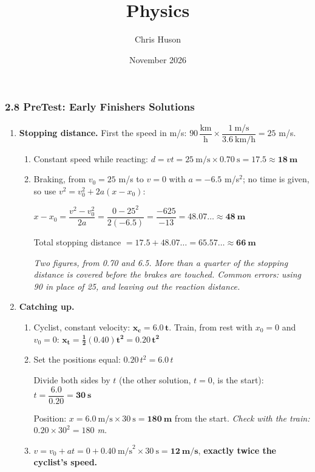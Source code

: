 \documentclass[12pt, twoside]{article}
\title{Physics}
\author{Chris Huson}
\date{November 2026}
\begin{document}
\subsubsection*{2.8 PreTest: Early Finishers Solutions}

\begin{enumerate}[itemsep=0.5cm, start=9]

\item \textbf{Stopping distance.} First the speed in m/s:
  $90\,\dfrac{\text{km}}{\text{h}} \times \dfrac{1~\text{m/s}}{3.6~\text{km/h}}
  = 25$ m/s.
  \begin{enumerate}[itemsep=0.3cm]
    \item Constant speed while reacting: \quad $d = vt = 25~\text{m/s} \times
      0.70~\text{s} = 17.5 \approx \mathbf{18~\textbf{m}}$
    \item Braking, from $v_0 = 25$ m/s to $v = 0$ with $a = -6.5$ m/s$^2$; no time
      is given, so use $v^2 = v_0^2 + 2a(x - x_0)$:

      $x - x_0 = \dfrac{v^2 - v_0^2}{2a} = \dfrac{0 - 25^2}{2(-6.5)} =
      \dfrac{-625}{-13} = 48.07\ldots \approx \mathbf{48~\textbf{m}}$

      Total stopping distance $= 17.5 + 48.07\ldots = 65.57\ldots \approx
      \mathbf{66~\textbf{m}}$

      \emph{Two figures, from 0.70 and 6.5. More than a quarter of the stopping
      distance is covered before the brakes are touched. Common errors: using
      90 in place of 25, and leaving out the reaction distance.}
  \end{enumerate}

\item \textbf{Catching up.}
  \begin{enumerate}[itemsep=0.3cm]
    \item Cyclist, constant velocity: $\mathbf{x_c = 6.0\,t}$. \quad Train, from rest
      with $x_0 = 0$ and $v_0 = 0$: $\mathbf{x_t = \tfrac{1}{2}(0.40)t^2 = 0.20\,t^2}$
    \item Set the positions equal: \quad $0.20\,t^2 = 6.0\,t$

      Divide both sides by $t$ (the other solution, $t = 0$, is the start):
      \quad $t = \dfrac{6.0}{0.20} = \mathbf{30~\textbf{s}}$

      Position: $x = 6.0~\text{m/s} \times 30~\text{s} = \mathbf{180~\textbf{m}}$
      from the start. \emph{Check with the train: $0.20 \times 30^2 = 180$ m.}
    \item $v = v_0 + at = 0 + 0.40~\text{m/s}^2 \times 30~\text{s} =
      \mathbf{12~\textbf{m/s}}$, \textbf{exactly twice the cyclist's speed.}


\end{enumerate}
\end{enumerate}
\end{document}
